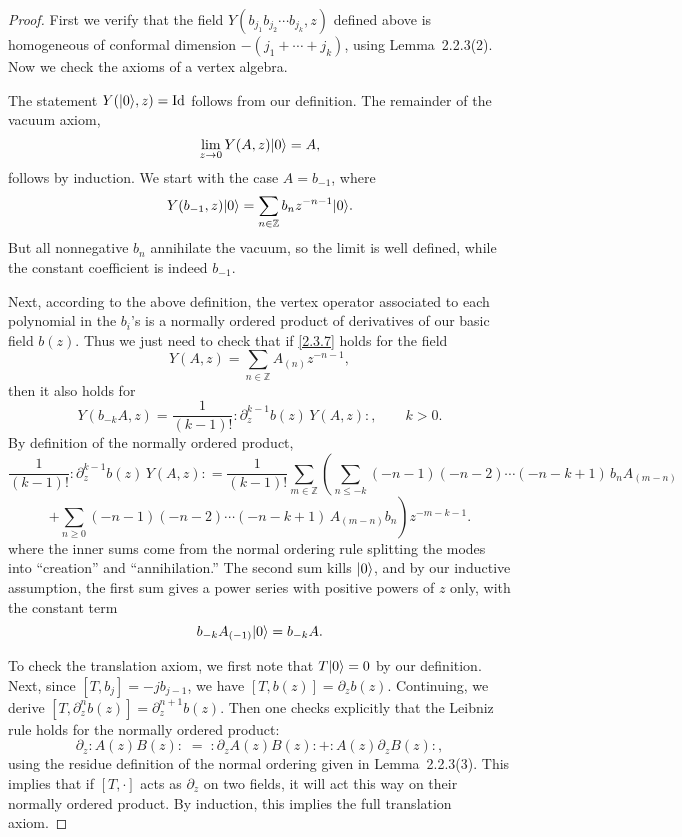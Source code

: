 \documentclass[12pt]{article}
\begin{document}
\begin{proof}
    First we verify that the field $Y(b_{j_1}b_{j_2}\cdots b_{j_k},z)$ defined above
    is homogeneous of conformal dimension $-(j_1+\cdots+j_k)$,
    using Lemma~2.2.3(2).
    Now we check the axioms of a vertex algebra.

    The statement $Y(\lvert 0 \rangle,z)=\mathrm{Id}$ follows from our definition.
    The remainder of the vacuum axiom,
    \begin{equation}\label{2.3.7}
        \lim_{z\to 0} Y(A,z)\lvert 0 \rangle = A,
    \end{equation}
    follows by induction. We start with the case $A=b_{-1}$, where
    \[
        Y(b_{-1},z)\lvert 0 \rangle = \sum_{n\in\mathbb{Z}} b_n z^{-n-1}\lvert 0 \rangle.
    \]
    But all nonnegative $b_n$ annihilate the vacuum,
    so the limit is well defined, while the constant coefficient is indeed $b_{-1}$.

    Next, according to the above definition, the vertex operator associated to each
    polynomial in the $b_i$’s is a normally ordered product of derivatives
    of our basic field $b(z)$. Thus we just need to check that if \eqref{2.3.7}
    holds for the field
    \[
        Y(A,z)=\sum_{n\in\mathbb{Z}} A_{(n)}z^{-n-1},
    \]
    then it also holds for
    \[
        Y(b_{-k}A,z)
        = \frac{1}{(k-1)!}:\partial_z^{k-1}b(z)\,Y(A,z):,\qquad k>0.
    \]
    By definition of the normally ordered product,
    \[
        \frac{1}{(k-1)!}:\partial_z^{k-1}b(z)\,Y(A,z):
        = \frac{1}{(k-1)!}\sum_{m\in\mathbb{Z}}\!\!
        \left(
        \sum_{n\le -k} (-n-1)(-n-2)\cdots(-n-k+1)\,b_nA_{(m-n)}\right.
    \]
    \[
        \left.
        +\sum_{n\ge 0} (-n-1)(-n-2)\cdots(-n-k+1)\,A_{(m-n)}b_n
        \right)z^{-m-k-1}.
    \]
    where the inner sums come from the normal ordering rule splitting the modes into “creation” and “annihilation.”
    The second sum kills $\lvert 0 \rangle$, and by our inductive assumption,
    the first sum gives a power series with positive powers of $z$ only,
    with the constant term
    \[
        b_{-k}A_{(-1)}\lvert 0 \rangle = b_{-k}A.
    \]

    To check the translation axiom, we first note that $T\lvert 0 \rangle=0$ by our definition.
    Next, since $[T,b_j] = -j b_{j-1}$, we have $[T,b(z)] = \partial_z b(z)$.
    Continuing, we derive $[T,\partial_z^n b(z)] = \partial_z^{n+1} b(z)$.
    Then one checks explicitly that the Leibniz rule holds for the normally ordered product:
    \[
        \partial_z :A(z)B(z): \;=\; :\partial_z A(z)B(z): + :A(z)\partial_z B(z):,
    \]
    using the residue definition of the normal ordering given in Lemma~2.2.3(3).
    This implies that if $[T,\cdot]$ acts as $\partial_z$ on two fields,
    it will act this way on their normally ordered product.
    By induction, this implies the full translation axiom.


\end{proof}
\end{document}
